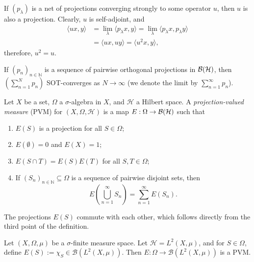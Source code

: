 \begin{remark}
  If $(p_\lambda)$ is a net of projections converging strongly to some operator $u$, then $u$ is also a projection.
  Clearly, $u$ is self-adjoint, and 
  \begin{align*}
    \langle ux, y \rangle &= \lim_{\lambda} \langle p_\lambda x, y\rangle = \lim_{\lambda} \langle p_\lambda x, p_\lambda y \rangle\\
    &= \langle ux, uy\rangle = \langle u^2 x, y\rangle,
  \end{align*}
  therefore, $u^2 = u$.
\end{remark}

\begin{corollary}
  If $(p_n)_{n \in \mathbb{N}}$ is a sequence of pairwise orthogonal projections in $\operatorname{\mathcal{B} (\mathcal{H})}$,
  then $\left(\sum_{n = 1} ^N p_n\right)$ SOT-converges as $N \to \infty$ (we denote the limit by $\sum_{n = 1} ^\infty p_n$). 
\end{corollary}

\begin{definition}
  Let $X$ be a set, $\Omega$ a $\sigma$-algebra in $X$, and $\mathcal{H}$ a Hilbert space.
  A \emph{projection-valued measure} (PVM) for $(X, \Omega, \mathcal{H})$ is a map 
  $E: \Omega \to \operatorname{\mathcal{B} (\mathcal{H})}$ such that 
  \begin{enumerate}
    \item $E(S)$ is a projection for all $S \in \Omega$;
    \item $E(\emptyset) = 0$ and $E(X) = 1$;
    \item $E(S \cap T) = E(S) E(T)$ for all $S, T \in \Omega$;
    \item If $(S_n)_{n \in \mathbb{N}} \subseteq \Omega$ is a sequence of pairwise disjoint sets, then 
    $$E \left(\bigcup_{n = 1} ^\infty S_n\right) = \sum_{n = 1} ^\infty E(S_n).$$
  \end{enumerate}
\end{definition}

\begin{remark}
  The projections $E(S)$ commute with each other, which follows directly from the third point of the definition.
\end{remark}

\begin{example}
  Let $(X, \Omega, \mu)$ be a $\sigma$-finite measure space.
  Let $\mathcal{H} = L^2 (X, \mu)$, and for $S \in \Omega$, define $E(S) := \chi_S \in \mathcal{B} (L^2 (X, \mu))$. 
  Then $E: \Omega \to \mathcal{B}(L^2 (X, \mu))$ is a PVM.
\end{example}

